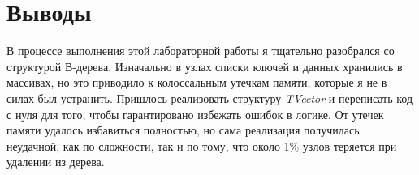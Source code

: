 \section{Выводы}
В процессе выполнения этой лабораторной работы я тщательно разобрался со структурой В-дерева. Изначально в узлах списки ключей и данных хранились в массивах, но это приводило к колоссальным утечкам памяти, которые я не в силах был устранить. Пришлось реализовать структуру {\itshape TVector} и переписать код с нуля для того, чтобы гарантировано избежать ошибок в логике. От утечек памяти удалось избавиться полностью, но сама реализация получилась неудачной, как по сложности, так и по тому, что около 1\% узлов теряется при удалении из дерева.
\pagebreak
